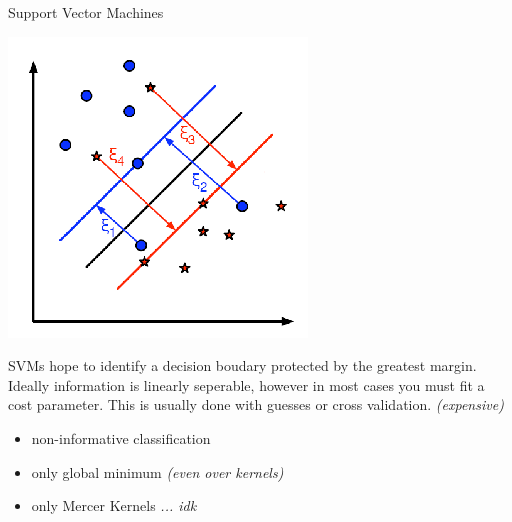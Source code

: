 \documentclass[10pt]{beamer}
\begin{document}
\begin{frame}{Support Vector Machines}

  \begin{multicols}{2}
    \includegraphics[width=\columnwidth]{./svm_basics3.png}
    \columnbreak

    SVMs hope to identify a decision boudary protected by the
    greatest margin. Ideally information is linearly seperable, however
    in most cases you must fit a cost parameter. This is usually done
    with guesses or cross validation. {\em (expensive)}
  \end{multicols}

  \begin{itemize}
  \item non-informative classification
  \item only global minimum {\em (even over kernels)}
  \item only Mercer Kernels {\em ... idk}
  \end{itemize}

\end{frame}
\end{document}
